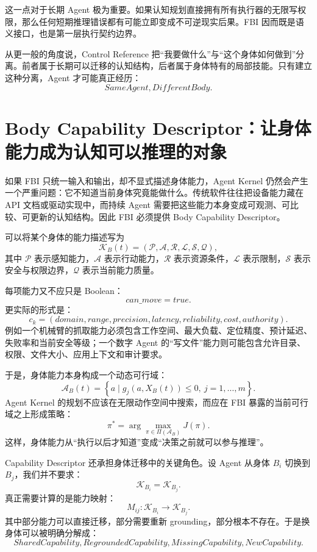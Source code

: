 这一点对于长期 Agent 极为重要。如果认知规划直接拥有所有执行器的无限写权限，那么任何短期推理错误都有可能立即变成不可逆现实后果。FBI 因而既是语义接口，也是第一层执行契约边界。

从更一般的角度说，Control Reference 把“我要做什么”与“这个身体如何做到”分离。前者属于长期可以迁移的认知结构，后者属于身体特有的局部技能。只有建立这种分离，Agent 才可能真正经历：
\[
\boxed{
SameAgent,
DifferentBody.
}
\]


\section{Body Capability Descriptor：让身体能力成为认知可以推理的对象}

如果 FBI 只统一输入和输出，却不显式描述身体能力，Agent Kernel 仍然会产生一个严重问题：它不知道当前身体究竟能做什么。传统软件往往把设备能力藏在 API 文档或驱动实现中，而持续 Agent 需要把这些能力本身变成可观测、可比较、可更新的认知结构。因此 FBI 必须提供 Body Capability Descriptor。

可以将某个身体的能力描述写为
\[
\mathcal K_B(t)
=
(
\mathcal P,
\mathcal A,
\mathcal R,
\mathcal L,
\mathcal S,
\mathcal Q
),
\]
其中 \(\mathcal P\) 表示感知能力，\(\mathcal A\) 表示行动能力，\(\mathcal R\) 表示资源条件，\(\mathcal L\) 表示限制，\(\mathcal S\) 表示安全与权限边界，\(\mathcal Q\) 表示当前能力质量。

每项能力又不应只是 Boolean：
\[
can\_move=true.
\]
更实际的形式是：
\[
c_k
=
(
domain,
range,
precision,
latency,
reliability,
cost,
authority
).
\]
例如一个机械臂的抓取能力必须包含工作空间、最大负载、定位精度、预计延迟、失败率和当前安全等级；一个数字 Agent 的“写文件”能力则可能包含允许目录、权限、文件大小、应用上下文和审计要求。

于是，身体能力本身构成一个动态可行域：
\[
\mathcal A_B(t)
=
\left\{
a\;|\;
g_j(a,X_B(t))\leq 0,
\ j=1,\ldots,m
\right\}.
\]
Agent Kernel 的规划不应该在无限动作空间中搜索，而应在 FBI 暴露的当前可行域之上形成策略：
\[
\pi^\ast
=
\arg\max_{\pi\in\Pi(\mathcal A_B)}
J(\pi).
\]
这样，身体能力从“执行以后才知道”变成“决策之前就可以参与推理”。

Capability Descriptor 还承担身体迁移中的关键角色。设 Agent 从身体 \(B_i\) 切换到 \(B_j\)，我们并不要求：
\[
\mathcal K_{B_i}
=
\mathcal K_{B_j}.
\]
真正需要计算的是能力映射：
\[
M_{ij}:
\mathcal K_{B_i}
\rightarrow
\mathcal K_{B_j}.
\]
其中部分能力可以直接迁移，部分需要重新 grounding，部分根本不存在。于是换身体可以被明确分解成：
\[
SharedCapability,
RegroundedCapability,
MissingCapability,
NewCapability.
\]

